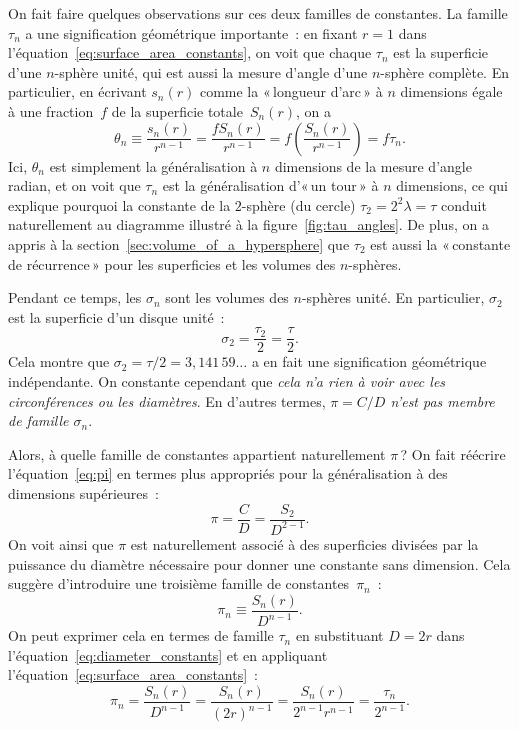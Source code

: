 On fait faire quelques observations sur ces deux familles de constantes. La famille $\tau_n$ a une signification géométrique importante~: en fixant $r=1$ dans l'équation~\eqref{eq:surface_area_constants}, on voit que chaque $\tau_n$ est la superficie d'une $n$-sphère unité, qui est aussi la mesure d'angle d'une $n$-sphère complète. En particulier, en écrivant $s_n(r)$ comme la «\,longueur d'arc\,» à $n$ dimensions égale à une fraction~$f$ de la superficie totale~$S_n(r)$, on a
\[
\theta_n \equiv \frac{s_n(r)}{r^{n-1}} = \frac{f S_n(r)}{r^{n-1}} = f\left(\frac{S_n(r)}{r^{n-1}}\right) = f\tau_n.
\]
Ici, $\theta_n$ est simplement la généralisation à $n$ dimensions de la mesure d'angle radian, et on voit que $\tau_n$ est la généralisation d'«\,un tour\,» à $n$ dimensions, ce qui explique pourquoi la constante de la $2$-sphère (du cercle) $\tau_2 = 2^2 \lambda = \tau$ conduit naturellement au diagramme illustré à la figure~\ref{fig:tau_angles}. De plus, on a appris à la section~\ref{sec:volume_of_a_hypersphere} que $\tau_2$ est aussi la «\,constante de récurrence\,» pour les superficies et les volumes des $n$-sphères.

Pendant ce temps, les $\sigma_n$ sont les volumes des $n$-sphères unité. En particulier, $\sigma_2$ est la superficie d'un disque unité~:
\[
\sigma_2 = \frac{\tau_2}{2} = \frac{\tau}{2}.
\]
Cela montre que $\sigma_2 = \tau/2 = 3{,}141\,59\ldots$ a en fait une signification géométrique indépendante. On constante cependant que \emph{cela n'a rien à voir avec les circonférences ou les diamètres}. En d'autres termes, \emph{$\pi = C/D$ n'est pas membre de famille $\sigma_n$}.

Alors, à quelle famille de constantes appartient naturellement $\pi$\,?
On fait réécrire l'équation~\eqref{eq:pi} en termes plus appropriés pour la généralisation à des dimensions supérieures~:
\[
\pi = \frac{C}{D} = \frac{S_2}{D^{2-1}}.
\]
On voit ainsi que $\pi$ est naturellement associé à des superficies divisées par la puissance du diamètre nécessaire pour donner une constante sans dimension. Cela suggère d'introduire une troisième famille de constantes~$\pi_n$~:
\begin{equation}
\label{eq:diameter_constants}
\pi_n \equiv \frac{S_n(r)}{D^{n-1}}.
\end{equation}
On peut exprimer cela en termes de famille $\tau_n$ en substituant $D = 2r$ dans l'équation~\eqref{eq:diameter_constants} et en appliquant l'équation~\eqref{eq:surface_area_constants}~:
\[
\pi_n = \frac{S_n(r)}{D^{n-1}} = \frac{S_n(r)}{(2r)^{n-1}} =
\frac{S_n(r)}{2^{n-1}r^{n-1}} = \frac{\tau_n}{2^{n-1}}.
\]


